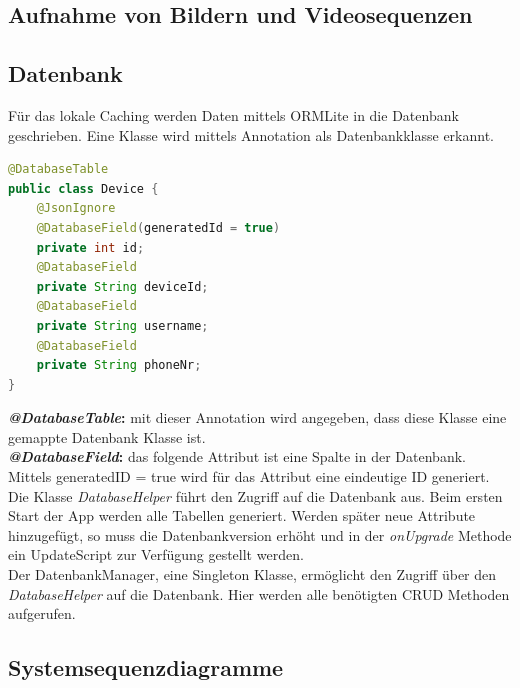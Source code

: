 \subsection{Aufnahme von Bildern und Videosequenzen}

\subsection{Datenbank}
Für das lokale Caching werden Daten mittels ORMLite in die Datenbank geschrieben. Eine Klasse wird mittels Annotation als Datenbankklasse erkannt.

\begin{lstlisting}[language=Java, caption=ORMLite Annotations]
@DatabaseTable
public class Device {
	@JsonIgnore
	@DatabaseField(generatedId = true)
	private int id;
	@DatabaseField
	private String deviceId;
	@DatabaseField
	private String username;
	@DatabaseField
	private String phoneNr;
}
\end{lstlisting}

\textbf{\textit{@DatabaseTable}:} mit dieser Annotation wird angegeben, dass diese Klasse eine gemappte Datenbank Klasse ist.\\
\textbf{\textit{@DatabaseField}:} das folgende Attribut ist eine Spalte in der Datenbank. Mittels generatedID = true wird für das Attribut eine eindeutige ID generiert.\\

Die Klasse \textit{DatabaseHelper} führt den Zugriff auf die Datenbank aus. Beim ersten Start der App werden alle Tabellen generiert. Werden später neue Attribute hinzugefügt, so muss die Datenbankversion erhöht und in der \textit{onUpgrade} Methode ein UpdateScript zur Verfügung gestellt werden.\\

Der DatenbankManager, eine Singleton Klasse, ermöglicht den Zugriff über den \textit{DatabaseHelper} auf die Datenbank. Hier werden alle benötigten CRUD Methoden aufgerufen.

\subsection{Systemsequenzdiagramme}

